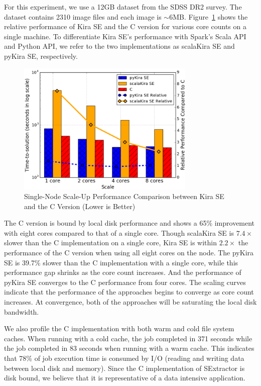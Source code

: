\documentclass[10pt,journal,compsoc]{IEEEtran}
\begin{document}
For this experiment, we use a 12GB dataset from the SDSS DR2 survey. The dataset contains
2310 image files and each image is $\sim$6MB.
Figure~\ref{fig:scaleup} shows the relative
performance of Kira SE and the C version for various core counts on a single machine.
To differentiate Kira SE's performance with Spark's Scala API and Python API, we refer
to the two implementations as scalaKira SE and pyKira SE, respectively.

\begin{figure}[h]
	\begin{center}
		\includegraphics[width=85mm]{pictures/scaleup}
		\caption{Single-Node Scale-Up Performance Comparison between Kira SE and the C Version (Lower is Better)
		\label{fig:scaleup}}
  	\end{center}
\end{figure}

The C version is bound by local disk performance and shows a 65\% improvement with
eight cores compared to that of a single core. 
Though scalaKira SE is $7.4\times$ slower than the C implementation
on a single core, Kira SE is within $2.2\times$ the performance of the C version when using all eight cores on the node.
The pyKira SE is 39.7\% slower than the C implementation with a single core, while this performance gap
shrinks as the core count increases. And the performance of pyKira SE converges to the C performance from four cores.
The scaling curves indicate that the performance of the approaches begins to converge
as core count increases. At convergence, both of the approaches will be saturating the local
disk bandwidth.

We also profile the C implementation with both warm and cold file system caches. When running with a
cold cache, the job completed in 371 seconds while the job completed in 83 seconds when
running with a warm cache. This indicates that 78\% of job execution time is consumed by
I/O (reading and writing data between local disk and memory). Since the C implementation of
SExtractor is disk bound, we believe that it is representative of a data intensive application. 
\end{document}
